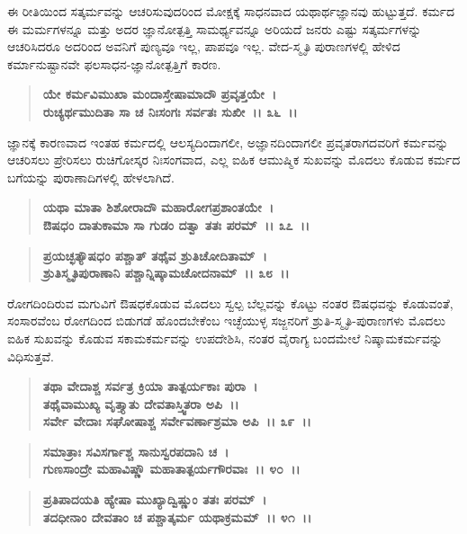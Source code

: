 ಈ ರೀತಿಯಿಂದ ಸತ್ಕರ್ಮವನ್ನು ಆಚರಿಸುವುದರಿಂದ ಮೋಕ್ಷಕ್ಕೆ ಸಾಧನವಾದ ಯಥಾರ್ಥ\-ಜ್ಞಾನವು ಹುಟ್ಟುತ್ತದೆ. ಕರ್ಮದ ಈ ಮರ್ಮಗಳನ್ನೂ ಮತ್ತು ಅದರ ಜ್ಞಾನೋತ್ಪತ್ತಿ ಸಾಮರ್ಥ್ಯವನ್ನೂ ಅರಿಯದೆ ಜನರು ಎಷ್ಟು ಸತ್ಕರ್ಮಗಳನ್ನು ಆಚರಿಸಿದರೂ ಅದರಿಂದ ಅವನಿಗೆ ಪುಣ್ಯವೂ ಇಲ್ಲ, ಪಾಪವೂ ಇಲ್ಲ. ವೇದ-ಸ್ಮೃತಿ ಪುರಾಣಗಳಲ್ಲಿ ಹೇಳಿದ ಕರ್ಮಾನುಷ್ಟಾನವೇ ಫಲ\-ಸಾಧನ-ಜ್ಞಾನೋತ್ಪತ್ತಿಗೆ ಕಾರಣ.

\begin{verse}
\textbf{ಯೇ ಕರ್ಮವಿಮುಖಾ ಮಂದಾಸ್ತೇಷಾಮಾದೌ ಪ್ರವೃತ್ತಯೇ~।}\\\textbf{ರುಚ್ಯರ್ಥಮುದಿತಾ ಸಾ ಚ ನಿಃಸಂಗಃ ಸರ್ವತಃ ಸುಖೀ~।। ೩೬~।।}
\end{verse}

ಜ್ಞಾನಕ್ಕೆ ಕಾರಣವಾದ ಇಂತಹ ಕರ್ಮದಲ್ಲಿ ಆಲಸ್ಯದಿಂದಾಗಲೀ, ಅಜ್ಞಾನದಿಂದಾಗಲೀ ಪ್ರವೃತರಾಗದವರಿಗೆ ಕರ್ಮವನ್ನು ಆಚರಿಸಲು ಪ್ರೇರಿಸಲು ರುಚಿಗೋಸ್ಕರ ನಿಃಸಂಗವಾದ, ಎಲ್ಲ ಐಹಿಕ ಆಮುಷ್ಮಿಕ ಸುಖವನ್ನು ಮೊದಲು ಕೊಡುವ ಕರ್ಮದ ಬಗೆಯನ್ನು ಪುರಾಣಾದಿಗಳಲ್ಲಿ ಹೇಳಲಾಗಿದೆ.

\begin{verse}
\textbf{ಯಥಾ ಮಾತಾ ಶಿಶೋರಾದೌ ಮಹಾರೋಗಪ್ರಶಾಂತಯೇ~।}\\\textbf{ಔಷಧಂ ದಾತುಕಾಮಾ ಸಾ ಗುಡಂ ದತ್ವಾ ತತಃ ಪರಮ್~।। ೩೭~।। } 
\end{verse}

\begin{verse}
\textbf{ಪ್ರಯಚ್ಛತ್ಯೌಷಧಂ ಪಶ್ಚಾತ್ ತಥೈವ ಶ್ರುತಿಚೋದಿತಾಮ್~।}\\\textbf{ಶ್ರುತಿಸ್ಮೃತಿಪುರಾಣಾನಿ ಪಶ್ಚಾನ್ನಿಷ್ಕಾಮಚೋದನಾಮ್~।। ೩೮~।।}
\end{verse}

ರೋಗದಿಂದಿರುವ ಮಗುವಿಗೆ ಔಷಧಕೊಡುವ ಮೊದಲು ಸ್ವಲ್ಪ ಬೆಲ್ಲವನ್ನು ಕೊಟ್ಟು ನಂತರ ಔಷಧವನ್ನು ಕೊಡುವಂತೆ, ಸಂಸಾರವೆಂಬ ರೋಗದಿಂದ ಬಿಡುಗಡೆ ಹೊಂದಬೇಕೆಂಬ ಇಚ್ಛೆಯುಳ್ಳ ಸಜ್ಜನರಿಗೆ ಶ್ರುತಿ-ಸ್ಮೃತಿ-ಪುರಾಣಗಳು ಮೊದಲು ಐಹಿಕ ಸುಖವನ್ನು ಕೊಡುವ ಸಕಾಮಕರ್ಮವನ್ನು ಉಪದೇಶಿಸಿ, ನಂತರ ವೈರಾಗ್ಯ ಬಂದಮೇಲೆ ನಿಷ್ಕಾಮಕರ್ಮವನ್ನು ವಿಧಿಸುತ್ತವೆ.

\begin{verse}
\textbf{ತಥಾ ವೇದಾಶ್ಚ ಸರ್ವತ್ರ ಕ್ರಿಯಾ ತಾತ್ಪರ್ಯಕಾಃ ಪುರಾ~।}\\\textbf{ತಥೈವಾಮುಖ್ಯ ವೃತ್ತ್ಯಾತು ದೇವತಾಸ್ತ್ವಿತರಾ ಅಪಿ~।। }\\\textbf{ಸರ್ವೇ ವೇದಾಃ ಸಘೋಷಾಶ್ಚ ಸರ್ವೇವರ್ಣಾಶ್ರಮಾ ಅಪಿ~।। ೩೯~।। }
\end{verse}

\begin{verse}
\textbf{ಸಮಾತ್ರಾಃ ಸವಿಸರ್ಗಾಶ್ಚ ಸಾನುಸ್ವರಪದಾನಿ ಚ~।}\\\textbf{ಗುಣಸಾಂದ್ರೇ ಮಹಾವಿಷ್ಣೌ ಮಹಾತಾತ್ಪರ್ಯಗೌರವಾಃ~।। ೪೦~।।} 
\end{verse}

\begin{verse}
\textbf{ಪ್ರತಿಪಾದಯತಿ ಹ್ಯೇಷಾ ಮುಖ್ಯಾದ್ವಿಷ್ಣುಂ ತತಃ ಪರಮ್~।}\\\textbf{ತದಧೀನಾಂ ದೇವತಾಂ ಚ ಪಶ್ಚಾತ್ಕರ್ಮ ಯಥಾಕ್ರಮಮ್~।। ೪೧~।।}
\end{verse}

